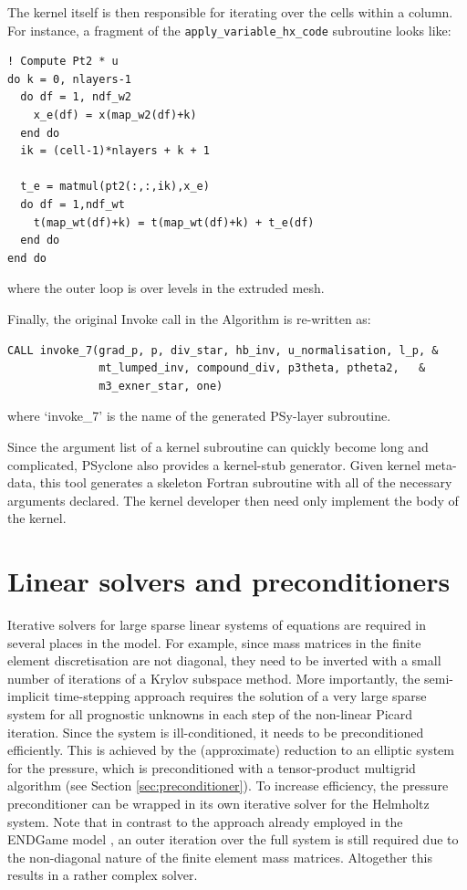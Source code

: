 \documentclass[times]{elsarticle}
\begin{document}
The kernel itself is then responsible for iterating over the cells
within a column. For instance, a fragment of the
\texttt{apply\_variable\_hx\_code} subroutine looks like:
\begin{lstlisting}
! Compute Pt2 * u
do k = 0, nlayers-1
  do df = 1, ndf_w2  
    x_e(df) = x(map_w2(df)+k)
  end do
  ik = (cell-1)*nlayers + k + 1
    
  t_e = matmul(pt2(:,:,ik),x_e)
  do df = 1,ndf_wt
    t(map_wt(df)+k) = t(map_wt(df)+k) + t_e(df)
  end do
end do
\end{lstlisting}
where the outer loop is over levels in the extruded mesh.

Finally, the original Invoke call in the Algorithm is re-written as:
\begin{lstlisting}
CALL invoke_7(grad_p, p, div_star, hb_inv, u_normalisation, l_p, &
              mt_lumped_inv, compound_div, p3theta, ptheta2,   &
              m3_exner_star, one)
\end{lstlisting}
where `invoke\_7' is the name of the generated PSy-layer subroutine.

Since the argument list of a kernel subroutine can quickly become long
and complicated, PSyclone also provides a kernel-stub generator. Given
kernel meta-data, this tool generates a skeleton Fortran subroutine
with all of the necessary arguments declared. The kernel developer
then need only implement the body of the kernel.

\section{\label{sec:Solver}Linear solvers and preconditioners}
Iterative solvers for large sparse linear systems of equations are
required in several places in the model. For example, since mass
matrices in the finite element discretisation are not diagonal, they
need to be inverted with a small number of iterations of a Krylov
subspace method. More importantly, the semi-implicit time-stepping
approach requires the solution of a very large sparse system for all
prognostic unknowns in each step of the non-linear Picard
iteration. Since the system is ill-conditioned, it needs to be
preconditioned efficiently. This is achieved by the (approximate)
reduction to an elliptic system for the pressure, which is
preconditioned with a tensor-product multigrid algorithm
\cite{Borm2001} (see Section \ref{sec:preconditioner}). To increase
efficiency, the pressure preconditioner can be wrapped in its own
iterative solver for the Helmholtz system. Note that in contrast to
the approach already employed in the ENDGame model \cite{QJ:QJ2235},
an outer iteration over the full system is still required due to the
non-diagonal nature of the finite element mass matrices. Altogether
this results in a rather complex solver.
\end{document}
